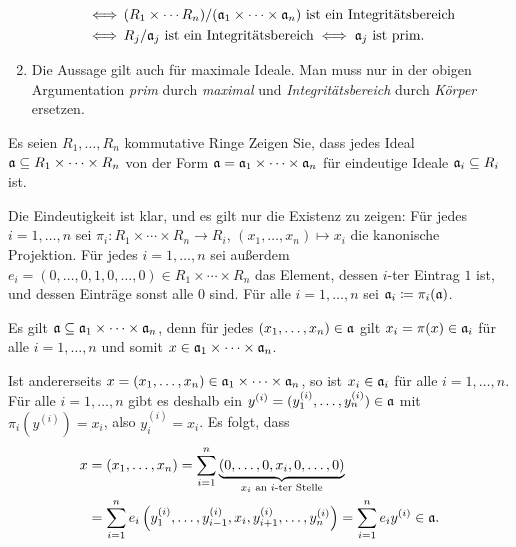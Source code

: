 \begin{solution}
\begin{enumerate}
\begin{gather*}
\begin{aligned}
          \iff&\, \text{$(R_1 \times \dotsb R_n)/(\mathfrak{a}_1 \times \dotsb \times \mathfrak{a}_n)$ ist ein Integritätsbereich}
          \\
          \iff&\, \text{$R_j/\mathfrak{a}_j$ ist ein Integritätsbereich}
          \iff \text{$\mathfrak{a}_j$ ist prim}.
        \end{aligned}
      \end{gather*}
    \item
      Die Aussage gilt auch für maximale Ideale.
      Man muss nur in der obigen Argumentation \emph{prim} durch \emph{maximal} und \emph{Integritätsbereich} durch \emph{Körper} ersetzen.
  \end{enumerate}
\end{solution}


\begin{question}
  \label{questions: ideals in products are products of ideal}
  Es seien $R_1, \dotsc, R_n$ kommutative Ringe
  Zeigen Sie, dass jedes Ideal $\mathfrak{a} \subseteq R_1 \times \dotsb \times R_n$ von der Form $\mathfrak{a} = \mathfrak{a}_1 \times \dotsb \times \mathfrak{a}_n$ für eindeutige Ideale $\mathfrak{a}_i \subseteq R_i$ ist.
\end{question}


\begin{solution}
  Die Eindeutigkeit ist klar, und es gilt nur die Existenz zu zeigen:
  Für jedes $i = 1, \dotsc, n$ sei $\pi_i \colon R_1 \times \dotsb \times R_n \to R_i$, $(x_1, \dotsc, x_n) \mapsto x_i$ die kanonische Projektion.
  Für jedes $i = 1, \dotsc, n$ sei außerdem $e_i = (0, \dotsc, 0, 1, 0, \dotsc, 0) \in R_1 \times \dotsb \times R_n$ das Element, dessen $i$-ter Eintrag $1$ ist, und dessen Einträge sonst alle $0$ sind.
  Für alle $i = 1, \dotsc, n$ sei $\mathfrak{a}_i \coloneqq \pi_i(\mathfrak{a})$.
  
  Es gilt $\mathfrak{a} \subseteq \mathfrak{a}_1 \times \dotsb \times \mathfrak{a}_n$, denn für jedes $(x_1, \dotsc, x_n) \in \mathfrak{a}$ gilt $x_i = \pi(x) \in \mathfrak{a}_i$ für alle $i = 1, \dotsc, n$ und somit $x \in \mathfrak{a}_1 \times \dotsb \times \mathfrak{a}_n$.
  
  Ist andererseits $x = (x_1, \dotsc, x_n) \in \mathfrak{a}_1 \times \dotsb \times \mathfrak{a}_n$, so ist $x_i \in \mathfrak{a}_i$ für alle $i = 1, \dotsc, n$.
  Für alle $i = 1, \dotsc, n$ gibt es deshalb ein $y^{(i)} = (y^{(i)}_1, \dotsc, y^{(i)}_n) \in \mathfrak{a}$ mit $\pi_i(y^{(i)}) = x_i$, also $y^{(i)}_i = x_i$.
  Es folgt, dass
  \begin{align*}
        x
    &=  (x_1, \dotsc, x_n)
     =  \sum_{i=1}^n \underbrace{(0, \dotsc, 0, x_i, 0, \dotsc, 0)}_{\text{$x_i$ an $i$-ter Stelle}}
    \\
    &=  \sum_{i=1}^n e_i \left( y^{(i)}_1, \dotsc, y^{(i)}_{i-1}, x_i, y^{(i)}_{i+1}, \dotsc, y^{(i)}_n \right)
     =  \sum_{i=1}^n e_i y^{(i)}
    \in \mathfrak{a}.
  \end{align*}
\end{solution}


